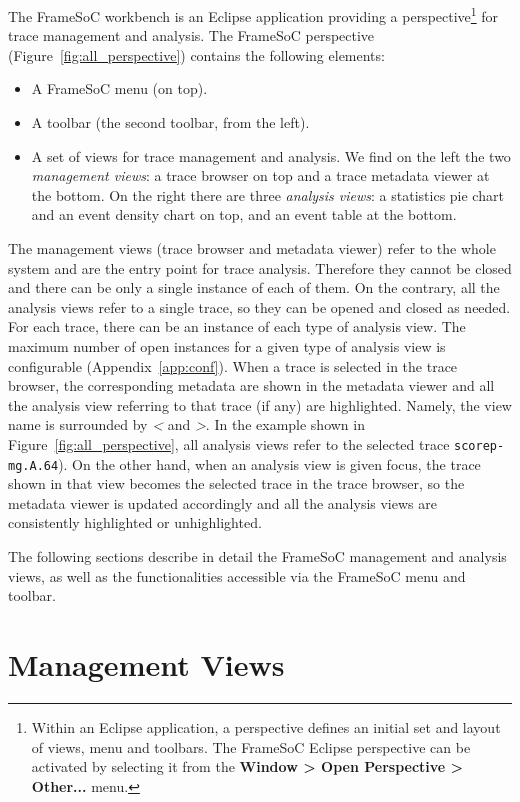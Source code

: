 \documentclass[twoside]{article}
\begin{document}
\begin{sloppypar}
The FrameSoC workbench is an Eclipse application providing a perspective\footnote{Within an Eclipse application, a perspective defines an initial set and layout of views, menu and toolbars. The FrameSoC Eclipse perspective can be activated by selecting it from the \textbf{Window > Open Perspective > Other...} menu.} for trace management and analysis.
The FrameSoC perspective (Figure~\ref{fig:all_perspective}) contains the following elements:
\begin{itemize}
 \item A FrameSoC menu (on top).
 \item A toolbar (the second toolbar, from the left).
 \item A set of views for trace management and analysis. We find on the left the two \emph{management views}: a trace browser on top and a trace metadata viewer at the bottom. On the right there are three \emph{analysis views}: a statistics pie chart and an event density chart on top, and an event table at the bottom. 
\end{itemize}

The management views (trace browser and metadata viewer) refer to the whole system and are the entry point for trace analysis.
Therefore they cannot be closed and there can be only a single instance of each of them.
On the contrary, all the analysis views refer to a single trace, so they can be opened and closed as needed. 
For each trace, there can be an instance of each type of analysis view. 
The maximum number of open instances for a given type of analysis view is configurable (Appendix~\ref{app:conf}).
When a trace is selected in the trace browser, the corresponding metadata are shown in the metadata viewer and all the analysis view referring to that trace (if any) are highlighted. Namely, the view name is surrounded by \emph{<} and \emph{>}. 
In the example shown in Figure~\ref{fig:all_perspective}, all analysis views refer to the selected trace \texttt{scorep-mg.A.64}).
On the other hand, when an analysis view is given focus, the trace shown in that view becomes the selected trace in the trace browser, so the metadata viewer is updated accordingly and all the analysis views are consistently highlighted or unhighlighted. 

The following sections describe in detail the FrameSoC management and analysis views, as well as the functionalities accessible via the FrameSoC menu and toolbar.

\section{Management Views}
\label{sec:management}


\end{sloppypar}
\end{document}
